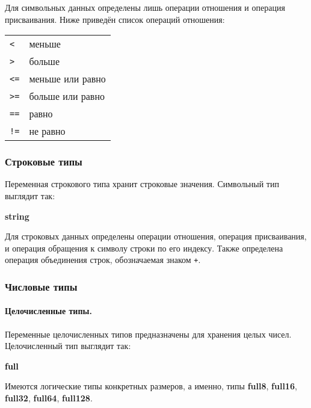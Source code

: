 \documentclass[10pt]{report}
\begin{document}
Для символьных данных определены лишь операции отношения и операция присваивания. Ниже приведён список операций отношения:

\begin{tabular}{ll}
 \texttt{<}         & меньше                                        \\
 \texttt{>}         & больше                                        \\
 \texttt{<=}        & меньше или равно                              \\
 \texttt{>=}        & больше или равно                              \\
 \texttt{==}        & равно                                         \\
 \texttt{!=}        & не равно                                      \\
\end{tabular}

        \subsubsection{Строковые типы}
Переменная строкового типа хранит строковые значения. Символьный тип выглядит так:
\begin{center}
\noindent\textbf{string}
\end{center}

Для строковых данных определены операции отношения, операция присваивания, и операция обращения к символу строки по его индексу. Также определена операция объединения строк, обозначаемая знаком \glqq\texttt{+}\grqq.

        \subsubsection{Числовые типы}
            \paragraph{Целочисленные типы.}Переменные целочисленных типов предназначены для хранения целых чисел. Целочисленный тип выглядит так:
\begin{center}
\noindent\textcolor{Green}{\textcolor{Black}{\textbf{full}} }\end{center}
Имеются логические типы конкретных размеров, а именно, типы \textbf{full8}, \textbf{full16},
\textbf{full32}, \textbf{full64}, \textbf{full128}.
\end{document}
